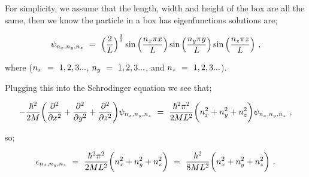 \documentclass{article}
\begin{document}
For simplicity, we assume that the length, width and height of the box are all the same, then we know the particle in a box has eigenfunctions solutions are;

\begin{equation} \label{eb-eq-256-74}
\psi_{n_x, n_y, n_z} \hspace{0.125cm} = \hspace{0.125cm} \Big( \frac{2}{L}  \Big)^{\frac{3}{2}} \sin \Big( \frac{n_x \pi x}{L} \Big) \sin \Big( \frac{n_y \pi y}{L} \Big) \sin \Big( \frac{n_z \pi z}{L} \Big) \hspace{0.125cm} ,
\end{equation}

where (\begin{math} n_x \hspace{0.125cm} = \hspace{0.125cm} 1,2,3... \end{math}, \begin{math} n_y \hspace{0.125cm} = \hspace{0.125cm} 1,2,3... \end{math}, and \begin{math} n_z \hspace{0.125cm} = \hspace{0.125cm} 1,2,3... \end{math}). 

Plugging this into the Schrodinger equation we see that;

\begin{equation} \label{eb-eq-256-75}
- \frac{\hbar^2}{2 M} \bigg( \frac{\partial^2}{\partial{x^2}} + \frac{\partial^2}{\partial{y^2}} + \frac{\partial^2}{\partial{z^2}} \bigg) \psi_{n_x, n_y, n_z} \hspace{0.125cm} = \hspace{0.125cm} \frac{\hbar^2 \pi^2}{2 M L^2} \bigg( n_x^2 + n_y^2 + n_z^2  \bigg) \psi_{n_x, n_y, n_z} \hspace{0.125cm} ,
\end{equation}

so;

\begin{equation} \label{eb-eq-256-76}
\epsilon_{n_x, n_y, n_z} \hspace{0.125cm} = \hspace{0.125cm} \frac{\hbar^2 \pi^2}{2 M L^2} \bigg( n_x^2 + n_y^2 + n_z^2  \bigg) \hspace{0.125cm} = \hspace{0.125cm} \frac{h^2}{8 M L^2} \bigg( n_x^2 + n_y^2 + n_z^2  \bigg) \hspace{0.125cm} .
\end{equation}
\end{document}
